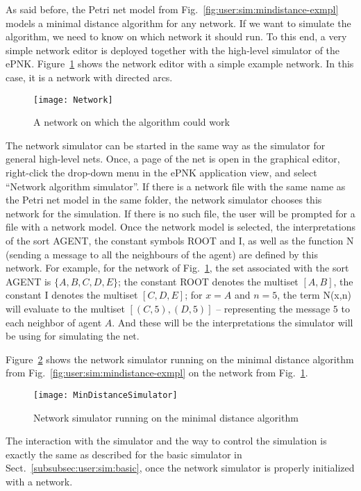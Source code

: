 As said before, the Petri net model from
Fig.~\ref{fig:user:sim:mindistance-exmpl} models a minimal
distance algorithm for any network. If we want to simulate the
algorithm, we need to know on which network it should run. To this end,
a very simple network editor is deployed together with the high-level
simulator of the ePNK. Figure~\ref{fig:user:sim:network} shows the
network editor with a simple example network. In this case, it
is a network with directed arcs.
%
\begin{figure}[hbt!!]
  \centerline{\texttt{[image: Network]}}
  \caption{A network on which the algorithm could work}
  \label{fig:user:sim:network}
\end{figure}
%
The network simulator can be started in the same way as the simulator for
general high-level nets. Once, a page of the net is open in the graphical
editor, right-click the drop-down menu in the ePNK application view, and
select ``Network algorithm simulator''. If there is a network file with
the same name as the Petri
net model in the same folder, the network simulator chooses this network for
the simulation. If there is no such file, the user will be prompted for
a file with a network model. Once the network model is selected, the
interpretations of the sort {\sf AGENT}, the constant symbols {\sf ROOT}
and {\sf I}, as well as the function {\sf N} (sending a message to all
the neighbours of the agent) are defined by this network. For example, for
the network of Fig.~\ref{fig:user:sim:network}, the set associated with
the sort {\sf AGENT} is $\{ A, B, C, D, E \}$; the constant {\sf ROOT}
denotes the multiset $[A, B]$, the constant {\sf I} denotes the multiset
$[ C, D, E]$; for $x = A$ and $n = 5$, the term {\sf N(x,n)} will evaluate to
the multiset $[ (C,5), (D,5) ]$ -- representing the message $5$ to each neighbor
of agent $A$. And these will be the interpretations the simulator will be using
for simulating the net.

Figure~\ref{fig:user:sim:mindistance-sim} shows the network simulator running
on the minimal distance algorithm from
Fig.~\ref{fig:user:sim:mindistance-exmpl} on the network from
Fig.~\ref{fig:user:sim:network}.
%
\begin{figure}[hbt!!]
  \centerline{\texttt{[image: MinDistanceSimulator]}}
  \caption{Network simulator running on the minimal distance algorithm}
  \label{fig:user:sim:mindistance-sim}
\end{figure}
% 
The interaction with the simulator and the way to control the simulation is
exactly the same as described for the basic simulator in
Sect.~\ref{subsubsec:user:sim:basic}, once the network simulator is
properly initialized with a network.


